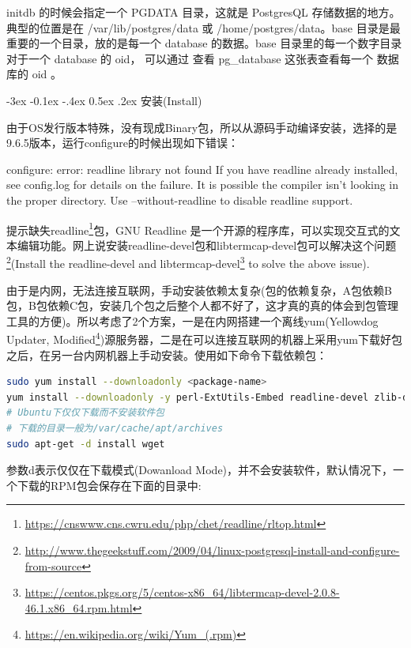 \documentclass[12pt]{book}
\makeatletter
\numberwithin{dummy}{section}
\theoremstyle{ocrenumbox}
\theoremstyle{blacknumex}
\theoremstyle{blacknumbox}
\theoremstyle{ocrenum}
\renewcommand{\subsection}{\@startsection {subsection}{2}{\z@}
	{-3ex \@plus -0.1ex \@minus -.4ex}
	{0.5ex \@plus.2ex }
	{\normalfont\sffamily\bfseries}}
\makeatother
\begin{document}
initdb 的时候会指定一个 PGDATA 目录，这就是 PostgresQL 存储数据的地方。典型的位置是在 /var/lib/postgres/data 或 /home/postgres/data。base 目录是最重要的一个目录，放的是每一个 database 的数据。base 目录里的每一个数字目录对于一个 database 的 oid， 可以通过 查看 pg\_database 这张表查看每一个 数据库的 oid 。


\subsection{安装(Install)}

由于OS发行版本特殊，没有现成Binary包，所以从源码手动编译安装，选择的是9.6.5版本，运行configure的时候出现如下错误：

configure: error: readline library not found
If you have readline already installed, see config.log for details on the
failure.  It is possible the compiler isn't looking in the proper directory.
Use --without-readline to disable readline support.

提示缺失readline\footnote{\url{https://cnswww.cns.cwru.edu/php/chet/readline/rltop.html}}包，GNU Readline 是一个开源的程序库，可以实现交互式的文本编辑功能。网上说安装readline-devel包和libtermcap-devel包可以解决这个问题\footnote{\url{http://www.thegeekstuff.com/2009/04/linux-postgresql-install-and-configure-from-source}}(Install the readline-devel and libtermcap-devel\footnote{\url{https://centos.pkgs.org/5/centos-x86_64/libtermcap-devel-2.0.8-46.1.x86_64.rpm.html}} to solve the above issue).

由于是内网，无法连接互联网，手动安装依赖太复杂(包的依赖复杂，A包依赖B包，B包依赖C包，安装几个包之后整个人都不好了，这才真的真的体会到包管理工具的方便)。所以考虑了2个方案，一是在内网搭建一个离线yum(Yellowdog Updater, Modified\footnote{\url{https://en.wikipedia.org/wiki/Yum_(.rpm)}})源服务器，二是在可以连接互联网的机器上采用yum下载好包之后，在另一台内网机器上手动安装。使用如下命令下载依赖包：

\begin{lstlisting}[language=Bash]
sudo yum install --downloadonly <package-name>
yum install --downloadonly -y perl-ExtUtils-Embed readline-devel zlib-devel pam-devel libxml2-devel libxslt-devel openldap-devel python-devel gcc-c++ openssl-devel cmake
# Ubuntu下仅仅下载而不安装软件包
# 下载的目录一般为/var/cache/apt/archives
sudo apt-get -d install wget
\end{lstlisting}

参数d表示仅仅在下载模式(Dowanload Mode)，并不会安装软件，默认情况下，一个下载的RPM包会保存在下面的目录中:
\end{document}
